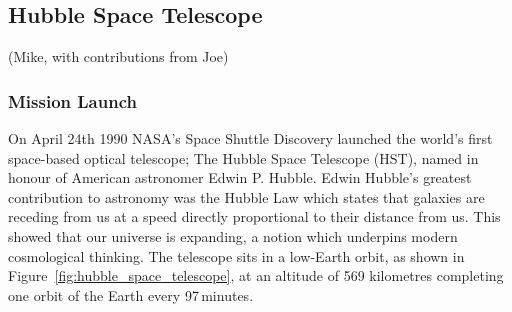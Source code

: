 
\subsection{Hubble Space Telescope} %
\label{sub:hubble_space_telescope}
(Mike, with contributions from Joe)

	\subsubsection{Mission Launch} %
	\label{ssub:mission_launch}
		On April 24th 1990 NASA's Space Shuttle Discovery launched the world's first space-based optical telescope; The Hubble Space Telescope (HST), named in honour of American astronomer Edwin P. Hubble. Edwin Hubble's greatest contribution to astronomy was the Hubble Law which states that galaxies are receding from us at a speed directly proportional to their distance from us. This showed that our universe is expanding, a notion which underpins modern cosmological thinking. The telescope sits in a low-Earth orbit, as shown in Figure~\ref{fig:hubble_space_telescope}, at an altitude of 569 kilometres completing one orbit of the Earth every 97\,minutes\cite{Hubsite_1}.

